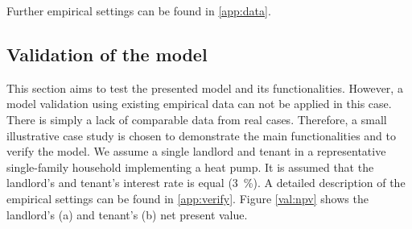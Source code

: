 Further empirical settings can be found in \ref{app:data}.

\subsection{Validation of the model}\label{met:validate}
This section aims to test the presented model and its functionalities. However, a model validation using existing empirical data can not be applied in this case. There is simply a lack of comparable data from real cases. Therefore, a small illustrative case study is chosen to demonstrate the main functionalities and to verify the model. We assume a single landlord and tenant in a representative single-family household implementing a heat pump. It is assumed that the landlord's and tenant's interest rate is equal (\SI{3}{\%}). A detailed description of the empirical settings can be found in \ref{app:verify}. Figure \ref{val:npv} shows the landlord's (a) and tenant's (b) net present value. 

